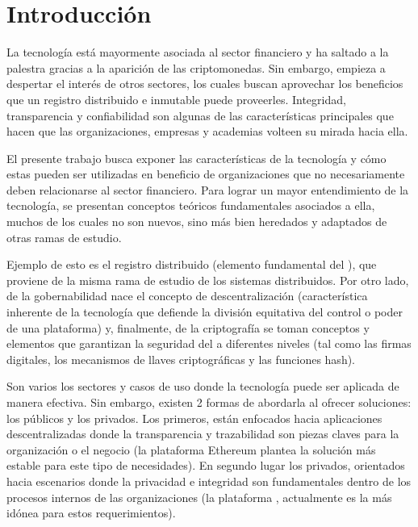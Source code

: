 \chapter{Introducción}
\label{capitulo1}

La tecnología  está mayormente asociada al sector financiero y ha saltado a la palestra gracias a la aparición de las criptomonedas. Sin embargo,  empieza a despertar el interés de otros sectores, los cuales buscan aprovechar los beneficios que un registro distribuido e inmutable puede proveerles. Integridad, transparencia y confiabilidad son algunas de las características principales que hacen que las organizaciones, empresas y academias volteen su mirada hacia ella.

El presente trabajo busca exponer las características de la tecnología   y cómo estas pueden ser utilizadas en beneficio de organizaciones que no necesariamente deben relacionarse al sector financiero. Para lograr un mayor entendimiento de la tecnología, se presentan conceptos teóricos fundamentales asociados a ella, muchos de los cuales no son nuevos, sino más bien heredados y adaptados de otras ramas de estudio. 

Ejemplo de esto es el registro distribuido (elemento fundamental del ), que proviene de la misma rama de estudio de los sistemas distribuidos. Por otro lado, de la gobernabilidad nace el concepto de descentralización (característica inherente de la tecnología que defiende la división equitativa del control o poder de una plataforma) y, finalmente, de la criptografía se toman conceptos y elementos que garantizan la seguridad del  a diferentes niveles (tal como las firmas digitales, los mecanismos de llaves criptográficas y las funciones hash).

Son varios los sectores y casos de uso donde la tecnología  puede ser aplicada de manera efectiva. Sin embargo, existen 2 formas de abordarla al ofrecer soluciones: los  públicos y los privados. Los primeros, están enfocados hacia aplicaciones descentralizadas donde la transparencia y trazabilidad son piezas claves para la organización o el negocio (la plataforma Ethereum plantea la solución más estable para este tipo de necesidades). En segundo lugar los  privados, orientados hacia  escenarios donde la privacidad e integridad son fundamentales dentro de los procesos internos de las organizaciones (la plataforma , actualmente es la más idónea para estos requerimientos).

